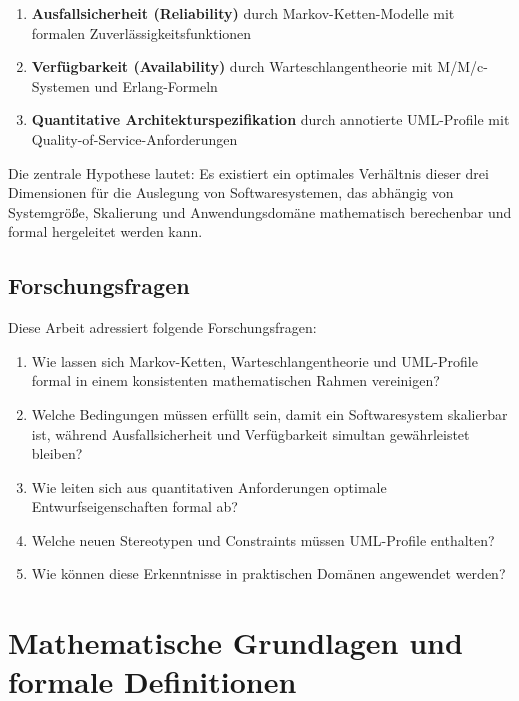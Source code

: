 \documentclass[a4paper,11pt]{article}
\theoremstyle{definition}
\begin{document}
\begin{enumerate}
    \item \textbf{Ausfallsicherheit (Reliability)} durch Markov-Ketten-Modelle mit formalen 
          Zuverlässigkeitsfunktionen
    \item \textbf{Verfügbarkeit (Availability)} durch Warteschlangentheorie mit M/M/c-Systemen 
          und Erlang-Formeln
    \item \textbf{Quantitative Architekturspezifikation} durch annotierte UML-Profile mit 
          Quality-of-Service-Anforderungen
\end{enumerate}

Die zentrale Hypothese lautet: Es existiert ein optimales Verhältnis dieser drei Dimensionen 
für die Auslegung von Softwaresystemen, das abhängig von Systemgröße, Skalierung und 
Anwendungsdomäne mathematisch berechenbar und formal hergeleitet werden kann.

\subsection{Forschungsfragen}

Diese Arbeit adressiert folgende Forschungsfragen:

\begin{enumerate}
    \item Wie lassen sich Markov-Ketten, Warteschlangentheorie und UML-Profile formal 
          in einem konsistenten mathematischen Rahmen vereinigen?
    \item Welche Bedingungen müssen erfüllt sein, damit ein Softwaresystem skalierbar 
          ist, während Ausfallsicherheit und Verfügbarkeit simultan gewährleistet bleiben?
    \item Wie leiten sich aus quantitativen Anforderungen optimale Entwurfseigenschaften 
          formal ab?
    \item Welche neuen Stereotypen und Constraints müssen UML-Profile enthalten?
    \item Wie können diese Erkenntnisse in praktischen Domänen angewendet werden?
\end{enumerate}

\section{Mathematische Grundlagen und formale Definitionen}
\end{document}
